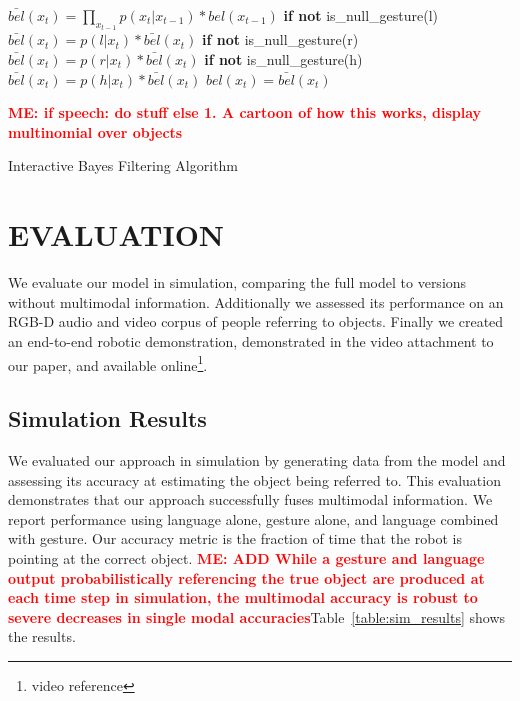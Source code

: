 \documentclass[letterpaper, 10 pt, conference]{ieeeconf}
\newcommand{\menote}[1]{\textcolor{Red}{\textbf{ME: #1}}}
\begin{document}
\begin{algorithm}
    \DontPrintSemicolon
    \BlankLine
    \BlankLine
     {
      $\bar{bel}(x_t) = \displaystyle\prod_{x_{t-1}} p(x_t|x_{t-1})*bel(x_{t-1})$
      \BlankLine
      \textbf{if not} is\_null\_gesture(l)
      \BlankLine
      \Indp$\bar{bel}(x_t) = p(l | x_t) *  \bar{bel}(x_t)$
      \BlankLine
      \Indm\textbf{if not} is\_null\_gesture(r)
      \BlankLine
      \Indp$\bar{bel}(x_t) = p(r | x_t) *  \bar{bel}(x_t)$
      \BlankLine
      \Indm\textbf{if not} is\_null\_gesture(h)
      \BlankLine
      \Indp$\bar{bel}(x_t) = p(h | x_t) *  \bar{bel}(x_t)$
      \BlankLine
      \Indm{}
      $bel(x_t) = \bar{bel}(x_t)$

    }
    \BlankLine
    \menote{if speech: do stuff else 1. A cartoon of how this works, display multinomial over objects}
\caption{Interactive Bayes Filtering Algorithm} 
\label{alg:algorithm}
\end{algorithm}



\section{EVALUATION}

We evaluate our model in simulation, comparing the full model to
versions without multimodal information.  Additionally we assessed its
performance on an RGB-D audio and video corpus of people referring to
objects.  Finally we created an end-to-end robotic demonstration,
demonstrated in the video attachment to our paper, and available
online\footnote{video reference}. 

\subsection{Simulation Results}

We evaluated our approach in simulation by generating data from the
model and assessing its accuracy at estimating the object being
referred to.  This evaluation demonstrates that our approach
successfully fuses multimodal information.  We report performance
using language alone, gesture alone, and language combined with
gesture.  Our accuracy metric is the fraction of time that the robot
is pointing at the correct object. \menote{ADD While a gesture and language output probabilistically referencing the true object are produced at each time step in simulation, the multimodal accuracy is robust to severe decreases in single modal accuracies}Table~\ref{table:sim_results}
shows the results.
\end{document}
